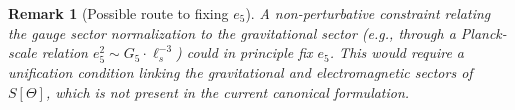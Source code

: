 \documentclass[11pt,a4paper]{article}
\newtheorem{remark}[proposition]{Remark}
\begin{document}
\begin{remark}[Possible route to fixing $e_5$]
A non-perturbative constraint relating the gauge sector normalization to the
gravitational sector (e.g., through a Planck-scale relation
$e_5^2\sim G_5\cdot\ell_s^{-3}$) could in principle fix $e_5$.  This would
require a unification condition linking the gravitational and electromagnetic
sectors of $S[\Theta]$, which is not present in the current canonical
formulation.
\end{remark}
\end{document}
